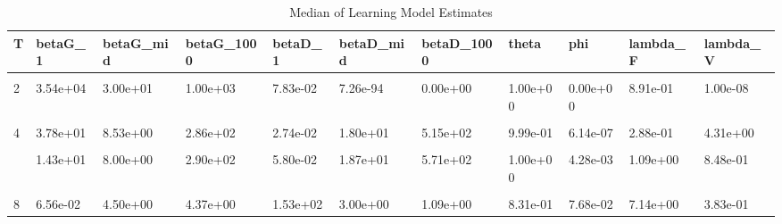 \begin{table}[!h]
\centering
\caption{Median of Learning Model Estimates}
\centering
\begin{tabular}[t]{lllllllllll}
\toprule
T & betaG\_1 & betaG\_mid & betaG\_1000 & betaD\_1 & betaD\_mid & betaD\_1000 & theta & phi & lambda\_F & lambda\_V\\
\midrule
\cellcolor{gray!10}{1} & \cellcolor{gray!10}{3.81e-04} & \cellcolor{gray!10}{6.00e+01} & \cellcolor{gray!10}{1.00e+03} & \cellcolor{gray!10}{7.19e-09} & \cellcolor{gray!10}{7.03e-09} & \cellcolor{gray!10}{4.92e-09} & \cellcolor{gray!10}{1.00e+00} & \cellcolor{gray!10}{9.32e-01} & \cellcolor{gray!10}{2.42e+01} & \cellcolor{gray!10}{8.75e+05}\\
2 & 3.54e+04 & 3.00e+01 & 1.00e+03 & 7.83e-02 & 7.26e-94 & 0.00e+00 & 1.00e+00 & 0.00e+00 & 8.91e-01 & 1.00e-08\\
\cellcolor{gray!10}{3} & \cellcolor{gray!10}{1.82e-01} & \cellcolor{gray!10}{4.00e+00} & \cellcolor{gray!10}{9.77e+00} & \cellcolor{gray!10}{3.82e-03} & \cellcolor{gray!10}{3.83e+01} & \cellcolor{gray!10}{8.07e+01} & \cellcolor{gray!10}{9.78e-01} & \cellcolor{gray!10}{6.07e-01} & \cellcolor{gray!10}{4.77e+00} & \cellcolor{gray!10}{3.70e+05}\\
4 & 3.78e+01 & 8.53e+00 & 2.86e+02 & 2.74e-02 & 1.80e+01 & 5.15e+02 & 9.99e-01 & 6.14e-07 & 2.88e-01 & 4.31e+00\\
\cellcolor{gray!10}{5} & \cellcolor{gray!10}{5.20e+00} & \cellcolor{gray!10}{6.00e+00} & \cellcolor{gray!10}{4.92e+00} & \cellcolor{gray!10}{3.18e-01} & \cellcolor{gray!10}{8.91e+00} & \cellcolor{gray!10}{7.68e+00} & \cellcolor{gray!10}{9.08e-01} & \cellcolor{gray!10}{1.36e-05} & \cellcolor{gray!10}{1.07e+00} & \cellcolor{gray!10}{4.73e-01}\\
\addlinespace
6 & 1.43e+01 & 8.00e+00 & 2.90e+02 & 5.80e-02 & 1.87e+01 & 5.71e+02 & 1.00e+00 & 4.28e-03 & 1.09e+00 & 8.48e-01\\
\cellcolor{gray!10}{7} & \cellcolor{gray!10}{7.95e+00} & \cellcolor{gray!10}{3.87e+00} & \cellcolor{gray!10}{3.67e+00} & \cellcolor{gray!10}{2.50e+01} & \cellcolor{gray!10}{3.00e+00} & \cellcolor{gray!10}{1.09e+00} & \cellcolor{gray!10}{7.65e-01} & \cellcolor{gray!10}{8.93e-03} & \cellcolor{gray!10}{3.84e+00} & \cellcolor{gray!10}{1.22e-02}\\
8 & 6.56e-02 & 4.50e+00 & 4.37e+00 & 1.53e+02 & 3.00e+00 & 1.09e+00 & 8.31e-01 & 7.68e-02 & 7.14e+00 & 3.83e-01\\
\bottomrule
\end{tabular}
\end{table}